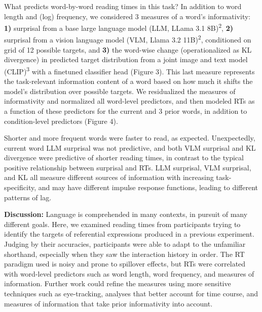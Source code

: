 \documentclass[11pt,a4paper]{article}
\begin{document}
\indent What predicts word-by-word reading times in this task? In addition to word length and (log) frequency, we considered 3 measures of a word's informativity: \textbf{1)} surprisal from a base large language model (LLM, LLama 3.1 8B)\textsuperscript{2}, \textbf{2)} surprisal from a vision language model (VLM, Llama 3.2 11B)\textsuperscript{2}, conditioned on grid of 12 possible targets, and \textbf{3)} the word-wise change (operationalized as KL divergence) in predicted target distribution from a joint image and text model (CLIP)\textsuperscript{3} with a finetuned classifier head (Figure 3). This last measure represents the task-relevant information content of a word based on how much it shifts the model's distribution over possible targets. We residualized the measures of informativity and normalized all word-level predictors, and then modeled RTs as a function of these predictors for the current and 3 prior words, in addition to condition-level predictors (Figure 4).

\indent Shorter and more frequent words were faster to read, as expected. Unexpectedly, current word LLM surprisal was not predictive, and both VLM surprisal and KL divergence were predictive of shorter reading times, in contrast to the typical positive relationship between surprisal and RTs. LLM surprisal, VLM surprisal, and KL all measure different sources of information with increasing task-specificity, and may have different impulse response functions, leading to different patterns of lag. 

\smallskip 

\noindent\textbf{Discussion:} Language is comprehended in many contexts, in pursuit of many different goals. Here, we examined reading times from participants trying to identify the targets of referential expressions produced in a previous experiment. Judging by their accuracies, participants were able to adapt to the unfamiliar shorthand, especially when they saw the interaction history in order. The RT paradigm used is noisy and prone to spillover effects, but RTs were correlated with word-level predictors such as word length, word frequency, and measures of information.  Further work could refine the measures using more sensitive techniques such as eye-tracking, analyses that better account for time course, and measures of information that take prior informativity into account.


\newpage
\end{document}
